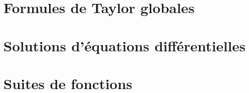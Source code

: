 

\section{Formules de Taylor globales}

\section{Solutions d'équations différentielles}

\section{Suites de fonctions}

